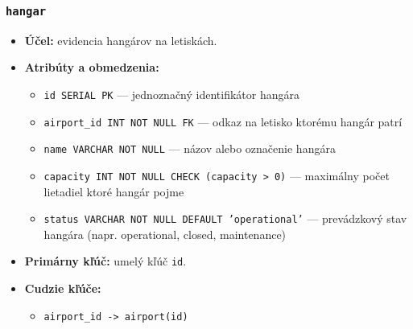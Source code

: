 \documentclass[11pt, a4paper]{article}
\begin{document}
\subsubsection*{\texttt{hangar}}
\begin{itemize}
    \item \textbf{Účel:} evidencia hangárov na letiskách.
    \item \textbf{Atribúty a obmedzenia:}
    \begin{itemize}
        \item \texttt{id SERIAL PK} --- jednoznačný identifikátor hangára
        \item \texttt{airport\_id INT NOT NULL FK} --- odkaz na letisko ktorému hangár patrí
        \item \texttt{name VARCHAR NOT NULL} --- názov alebo označenie hangára
        \item \texttt{capacity INT NOT NULL CHECK (capacity > 0)} --- maximálny počet lietadiel ktoré hangár pojme
        \item \texttt{status VARCHAR NOT NULL DEFAULT 'operational'} --- prevádzkový stav hangára (napr. operational, closed, maintenance)
    \end{itemize}
    \item \textbf{Primárny kľúč:} umelý kľúč \texttt{id}.
    \item \textbf{Cudzie kľúče:} 
        \begin{itemize}
            \item \texttt{airport\_id -> airport(id)}
        \end{itemize}
\end{itemize}
\end{document}
